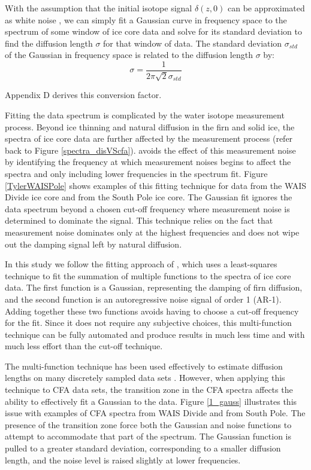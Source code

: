 \documentclass[draft, jgrga]{AGUTeX}
\begin{document}
\begin{article}
With the assumption that the initial isotope signal $\delta(z,0)$ can be approximated as white noise \citep{Gkinis2014}, we can simply fit a Gaussian curve in frequency space to the spectrum of some window of ice core data and solve for its standard deviation to find the diffusion length $\sigma$ for that window of data. The standard deviation $\sigma_{std}$ of the Gaussian in frequency space is related to the diffusion length $\sigma$ by:
\begin{equation}
  \sigma = \frac{1}{2\pi\sqrt{2}\sigma_{std}}
\end{equation}

Appendix D derives this conversion factor.

Fitting the data spectrum is complicated by the water isotope measurement process. Beyond ice thinning and natural diffusion in the firn and solid ice, the spectra of ice core data are further affected by the measurement process (refer back to Figure \ref{spectra_disVScfa}). \citet{Jones2016} avoids the effect of this measurement noise by identifying the frequency at which measurement noises begins to affect the spectra and only including lower frequencies in the spectrum fit. Figure \ref{TylerWAISPole} shows examples of this fitting technique for data from the WAIS Divide ice core \citep{Jones2016} and from the South Pole ice core. The Gaussian fit ignores the data spectrum beyond a chosen cut-off frequency where measurement noise is determined to dominate the signal. This technique relies on the fact that measurement noise dominates only at the highest frequencies and does not wipe out the damping signal left by natural diffusion.

In this study we follow the fitting approach of \citet{Gkinis2014}, which uses a least-squares technique to fit the summation of multiple functions to the spectra of ice core data. The first function is a Gaussian, representing the damping of firn diffusion, and the second function is an autoregressive noise signal of order 1 (AR-1). Adding together these two functions avoids having to choose a cut-off frequency for the fit. Since it does not require any subjective choices, this multi-function technique can be fully automated and produce results in much less time and with much less effort than the cut-off technique.

The multi-function technique has been used effectively to estimate diffusion lengths on many discretely sampled data sets \citep{Gkinis2014,Holme2017}. However, when applying this technique to CFA data sets, the transition zone in the CFA spectra affects the ability to effectively fit a Gaussian to the data. Figure \ref{1_gauss} illustrates this issue with examples of CFA spectra from WAIS Divide and from South Pole. The presence of the transition zone force both the Gaussian and noise functions to attempt to accommodate that part of the spectrum. The Gaussian function is pulled to a greater standard deviation, corresponding to a smaller diffusion length, and the noise level is raised slightly at lower frequencies.


\end{article}
\end{document}
